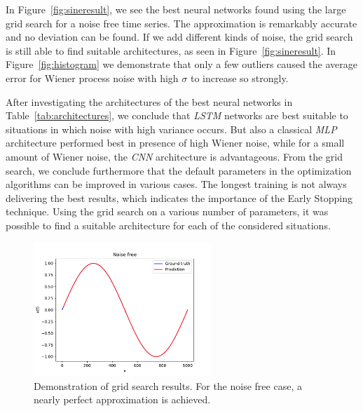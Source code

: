 \documentclass{article}
\begin{document}
In Figure~\ref{fig:sineresult}, we see the best neural networks found using 
the large grid search for a noise free time series. The approximation is 
remarkably accurate and no deviation can be found. If we add different kinds of 
noise, the grid search is still able to find suitable architectures, 
as seen in Figure~\ref{fig:sineresult}. In Figure~\ref{fig:histogram}
we demonstrate that only a few outliers caused the average error 
for Wiener process noise with high $\sigma$ to increase so strongly.

After 
investigating the architectures of the best neural networks in 
Table~\ref{tab:architectures}, we conclude that \emph{LSTM} networks are best 
suitable to situations in which noise with high variance occurs. But also a 
classical \emph{MLP} architecture performed best in presence of high Wiener
noise, while for a small amount
of Wiener noise, the \emph{CNN} architecture is advantageous. From the 
grid search, we conclude furthermore that the default parameters in the 
optimization algorithms can be improved in various cases. The longest training
is not always delivering the best results, which indicates the importance of 
the Early Stopping technique. Using the grid search on a various number of
parameters, it was possible to find a suitable architecture for each of the
considered situations.

\begin{figure}
    \centering
    \includegraphics[width=0.6\textwidth]{figures/Noise_free.pdf}
    \caption{Demonstration of grid search results. For the noise free case,
    a nearly perfect approximation is achieved.}
    \label{fig:sinenoisefree}
\end{figure}
\end{document}
